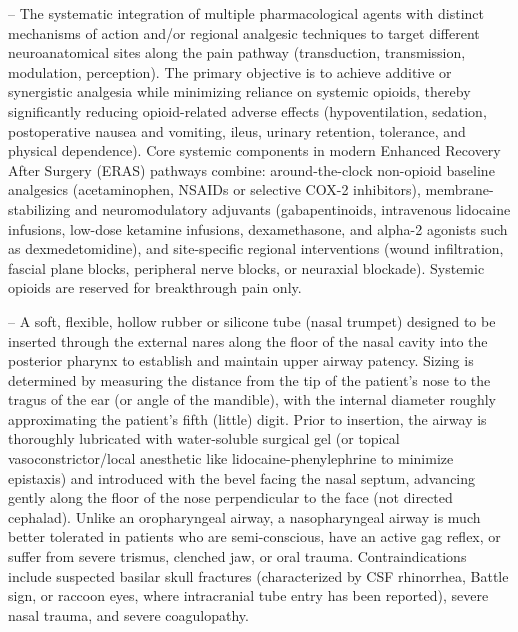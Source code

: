 -- The systematic integration of multiple pharmacological agents with distinct mechanisms of action and/or regional analgesic techniques to target different neuroanatomical sites along the pain pathway (transduction, transmission, modulation, perception). The primary objective is to achieve additive or synergistic analgesia while minimizing reliance on systemic opioids, thereby significantly reducing opioid-related adverse effects (hypoventilation, sedation, postoperative nausea and vomiting, ileus, urinary retention, tolerance, and physical dependence). Core systemic components in modern Enhanced Recovery After Surgery (ERAS) pathways combine: around-the-clock non-opioid baseline analgesics (acetaminophen, NSAIDs or selective COX-2 inhibitors), membrane-stabilizing and neuromodulatory adjuvants (gabapentinoids, intravenous lidocaine infusions, low-dose ketamine infusions, dexamethasone, and alpha-2 agonists such as dexmedetomidine), and site-specific regional interventions (wound infiltration, fascial plane blocks, peripheral nerve blocks, or neuraxial blockade). Systemic opioids are reserved for breakthrough pain only.

-- A soft, flexible, hollow rubber or silicone tube (nasal trumpet) designed to be inserted through the external nares along the floor of the nasal cavity into the posterior pharynx to establish and maintain upper airway patency. Sizing is determined by measuring the distance from the tip of the patient's nose to the tragus of the ear (or angle of the mandible), with the internal diameter roughly approximating the patient's fifth (little) digit. Prior to insertion, the airway is thoroughly lubricated with water-soluble surgical gel (or topical vasoconstrictor/local anesthetic like lidocaine-phenylephrine to minimize epistaxis) and introduced with the bevel facing the nasal septum, advancing gently along the floor of the nose perpendicular to the face (not directed cephalad). Unlike an oropharyngeal airway, a nasopharyngeal airway is much better tolerated in patients who are semi-conscious, have an active gag reflex, or suffer from severe trismus, clenched jaw, or oral trauma. Contraindications include suspected basilar skull fractures (characterized by CSF rhinorrhea, Battle sign, or raccoon eyes, where intracranial tube entry has been reported), severe nasal trauma, and severe coagulopathy.

